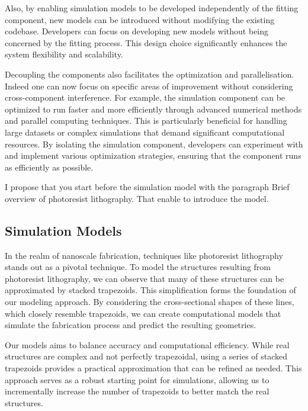 \medskip

Also, by enabling simulation models to be developed independently of the fitting component, 
new models can be introduced without modifying the existing codebase. Developers can 
focus on developing new models without being concerned by the fitting process. 
This design choice significantly enhances the system flexibility and scalability.

\medskip

Decoupling the components also facilitates the optimization and parallelisation. Indeed one can now focus on specific areas of improvement without
considering cross-component interference. For example, the simulation component can be optimized to
run faster and more efficiently through advanced numerical methods and parallel 
computing techniques. This is particularly beneficial for handling large datasets or complex simulations that demand significant 
computational resources. By isolating the simulation component, developers can experiment with and implement various optimization strategies, 
ensuring that the component runs as efficiently as possible.

\medskip

\color{red}I propose that you start before the simulation model with the paragraph Brief overview of photoresist lithography.
That enable to introduce the model. \color{black}


\subsection{Simulation Models}

In the realm of nanoscale fabrication, techniques like photoresist lithography stands out as a pivotal technique. To model the structures 
resulting from photoresist lithography, we can observe that many of these structures can be approximated by stacked trapezoids. 
This simplification forms the foundation of our modeling approach. By considering the cross-sectional shapes of these lines, which 
closely resemble trapezoids, we can create computational models that simulate the fabrication process and predict the resulting 
geometries.

\medskip

Our models aims to balance accuracy and computational efficiency. While real structures are complex and not perfectly trapezoidal, 
using a series of stacked trapezoids provides a practical approximation that can be refined as needed. This approach serves as a robust
starting point for simulations, allowing us to incrementally increase the number of trapezoids to better match the real structures.

